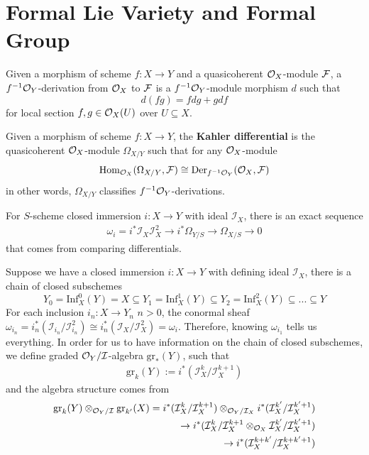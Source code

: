 \section{Formal Lie Variety and Formal Group}\label{sec:formalgroups-formalLie}

\begin{definition}
    Given a morphism of scheme $f: X\to Y$ and a quasicoherent $\mathcal{O}_X$-module $\mathcal{F}$, a $f^{-1}\mathcal{O}_Y$-derivation from $\mathcal{O}_X$ to $\mathcal{F}$ is a $f^{-1}\mathcal{O}_Y$-module morphism $d$ such that
    \[
    d(fg)=fdg+gdf
    \]for local section $f, g\in \mathcal{O}_X(U)$ over $U\subseteq X$.

    Given a morphism of scheme $f: X\to Y$, the \textbf{Kahler differential} is the quasicoherent $\mathcal{O}_X$-module $\Omega_{X/Y}$ such that for any $\mathcal{O}_X$-module
    \[
    \operatorname{Hom}_{\mathcal{O}_X}(\Omega_{X/Y}, \mathcal{F})\cong \mathrm{Der}_{f^{-1}\mathcal{O}_Y}(\mathcal{O}_X, \mathcal{F})
    \]in other words, $\Omega_{X/Y}$ classifies $f^{-1}\mathcal{O}_Y$-derivations.
\end{definition}

For $S$-scheme closed immersion $i:X\to Y$ with ideal $\mathcal{I}_X$, there is an exact sequence 
\begin{align*}
   \omega_i=i^*\mathcal{I}_X\mathcal{I}_X^2\to i^*\Omega_{Y/S}\to \Omega_{X/S}\to 0
\end{align*}that comes from comparing differentials.

Suppose we have a closed immersion $i: X\to Y$ with defining ideal $\mathcal{I}_X$, there is a chain of closed subschemes
\[
Y_0=\mathrm{Inf}_X^0(Y)=X\subseteq Y_1=\mathrm{Inf}_X^1(Y)\subseteq Y_2=\mathrm{Inf}_X^2(Y)\subseteq ... \subseteq Y
\]
For each inclusion $i_n: X\to Y_n$ $n>0$, the conormal sheaf $\omega_{i_n}=i_n^*(\mathcal{I}_{i_n}/\mathcal{I}_{i_n}^2)\cong i_n^*(\mathcal{I}_{X}/\mathcal{I}_{X}^2)=\omega_i$.
Therefore, knowing $\omega_{i_1}$ tells us everything. In order for us to have information on the chain of closed subschemes, we define graded $\mathcal{O}_{Y}/\mathcal{I}$-algebra $\mathrm{gr}_*(Y)$, such that
\begin{align*}
    \mathrm{gr}_k(Y):=i^*(\mathcal{I}_X^k/\mathcal{I}_X^{k+1})
\end{align*}
and the algebra structure comes from
\begin{align*}
 \mathrm{gr}_k(Y)\otimes_{\mathcal{O}_Y/\mathcal{I}}    \mathrm{gr}_{k'}(X)=i^*(\mathcal{I}_X^k/\mathcal{I}_X^{k+1})\otimes _{\mathcal{O}_Y/\mathcal{I}_X}i^*(\mathcal{I}_X^{k'}/\mathcal{I}_X^{k'+1})
    \\\to i^*(\mathcal{I}_X^k/\mathcal{I}_X^{k+1}\otimes _{\mathcal{O}_X}\mathcal{I}_X^{k'}/\mathcal{I}_X^{k'+1})
    \\ \to i^*(\mathcal{I}_X^{k+k'}/\mathcal{I}_X^{k+k'+1})
\end{align*}

